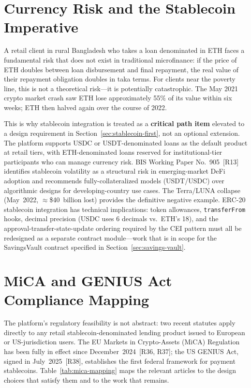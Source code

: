 \documentclass[12pt,a4paper]{report}
\begin{document}
\section{Currency Risk and the Stablecoin Imperative}

A retail client in rural Bangladesh who takes a loan denominated in ETH faces a fundamental risk that does not exist in traditional microfinance: if the price of ETH doubles between loan disbursement and final repayment, the real value of their repayment obligation doubles in taka terms. For clients near the poverty line, this is not a theoretical risk---it is potentially catastrophic. The May 2021 crypto market crash saw ETH lose approximately 55\% of its value within six weeks; ETH then halved again over the course of 2022.

This is why stablecoin integration is treated as a \textbf{critical path item} elevated to a design requirement in Section~\ref{sec:stablecoin-first}, not an optional extension. The platform supports USDC or USDT-denominated loans as the default product at retail tiers, with ETH-denominated loans reserved for institutional-tier participants who can manage currency risk. BIS Working Paper No.~905~[R13] identifies stablecoin volatility as a structural risk in emerging-market DeFi adoption and recommends fully-collateralized models (USDT/USDC) over algorithmic designs for developing-country use cases. The Terra/LUNA collapse (May~2022, $\approx$\$40~billion lost) provides the definitive negative example. ERC-20 stablecoin integration has technical implications: token allowances, \texttt{transferFrom} hooks, decimal precision (USDC uses 6 decimals vs.\ ETH's 18), and the approval-transfer-state-update ordering required by the CEI pattern must all be redesigned as a separate contract module---work that is in scope for the SavingsVault contract specified in Section~\ref{sec:savings-vault}.

\section{MiCA and GENIUS Act Compliance Mapping}
\label{sec:mica-compliance}

The platform's regulatory feasibility is not abstract: two recent statutes apply directly to any retail stablecoin-denominated lending product issued to European or US-jurisdiction users. The EU Markets in Crypto-Assets (MiCA) Regulation has been fully in effect since December~2024~[R36, R37]; the US GENIUS Act, signed in July~2025~[R38], establishes the first federal framework for payment stablecoins. Table~\ref{tab:mica-mapping} maps the relevant articles to the design choices that satisfy them and to the work that remains.
\end{document}
